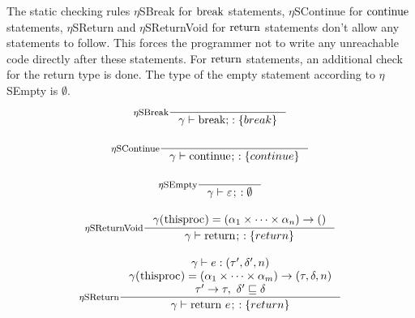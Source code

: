\documentclass[a4paper, 10pt, draft]{report}
\newcommand{\mycode}[1]{\ensuremath{\mbox{\lstinline{#1}}}}
\begin{document}
The static checking rules $\eta$SBreak for \mycode{break} statements,
$\eta$SContinue for \mycode{continue} statements, $\eta$SReturn and
$\eta$SReturnVoid for \mycode{return} statements don't allow any statements to
follow. This forces the programmer not to write any unreachable code directly
after these statements. For \mycode{return} statements, an additional check for
the return type is done. The type of the empty statement according to
$\eta$SEmpty is $\emptyset$.
\[ \begin{array}{c}
\inference[$\eta$SBreak]{}{\gamma |- \mycode{break;} : \left\{ break \right\} } \\[2em]
\inference[$\eta$SContinue]{}{\gamma |- \mycode{continue;} : \left\{ continue\right\} } \\[2em]
\inference[$\eta$SEmpty]{}{\gamma |- \varepsilon\mycode{;} : \emptyset } \\[2em]
\inference[$\eta$SReturnVoid]{
  \gamma(\mycode{thisproc}) = (\alpha_1\times\dots\times\alpha_n)\to()
}{
  \gamma |- \mycode{return;} : \left\{ return \right\}
} \\[2em]
\inference[$\eta$SReturn]{
  \gamma |- e : \left( \tau', \delta', n \right)  \\
  \gamma(\mycode{thisproc}) = (\alpha_1\times\dots\times\alpha_m)\to(\tau,\delta,n) \\
  \tau' \to \tau,\ \delta' \sqsubseteq \delta
}{
  \gamma |- \mycode{return}\ e \mycode{;} : \left\{ return \right\}
}
\end{array}\]
\end{document}
